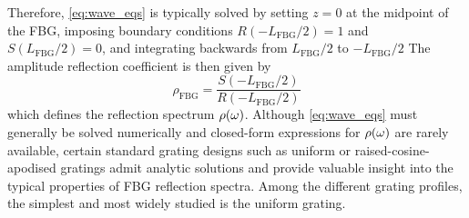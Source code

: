 Therefore, \eqref{eq:wave_eqs} is typically solved by setting $z = 0$ at the midpoint of the FBG, imposing boundary conditions $R(-L_\text{FBG}/2) = 1$ and $S(L_\text{FBG}/2) = 0$, and integrating backwards from $L_\text{FBG}/2$ to $-L_\text{FBG}/2$
The amplitude reflection coefficient is then given by
%
\begin{equation}
\label{eq:rho}
    \rho_\text{FBG} = \frac{S(-L_\text{FBG}/2)}{R(-L_\text{FBG}/2)}
\end{equation}
%
which defines the reflection spectrum $\rho(\omega)$.
Although \eqref{eq:wave_eqs} must generally be solved numerically and closed-form expressions for $\rho(\omega)$ are rarely available, certain standard grating designs such as uniform or raised-cosine-apodised gratings admit analytic solutions and provide valuable insight into the typical properties of FBG reflection spectra.
Among the different grating profiles, the simplest and most widely studied is the uniform grating.
%
%
